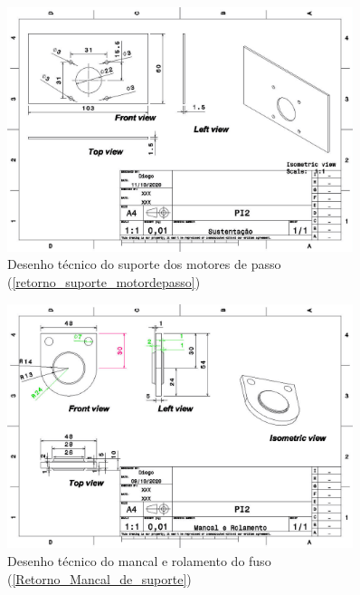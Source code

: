 \begin{apendicesenv}
\begin{figure}[H]
    \centering
    \includegraphics[width=0.9\textwidth]{figuras/estrutura/Desenhos/Sustentação_MotordePasso.jpg}
    \caption{Desenho técnico do suporte dos motores de passo (\ref{retorno_suporte_motordepasso})}
    \label{fig:supp_motordepasso}
\end{figure}

\begin{figure}[H]
    \centering
    \includegraphics[width=0.9\textwidth]{figuras/estrutura/Desenhos/Drawing1_MacaleRolamento.jpg}
    \caption{Desenho técnico do mancal e rolamento do fuso (\ref{Retorno_Mancal_de_suporte})}
    \label{fig:Mancal_Fuso}
\end{figure}


\end{apendicesenv}
